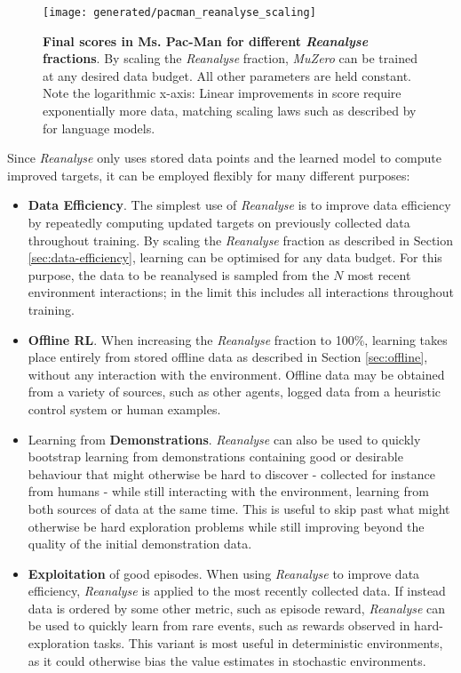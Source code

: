 \documentclass{article}
\newcommand{\muzero}{\emph{MuZero}}
\newcommand{\reanalyse}{\emph{Reanalyse}}
\begin{document}
\begin{figure}[t]
\texttt{[image: generated/pacman\_reanalyse\_scaling]}
\vspace*{-7mm}
\caption[]{
\label{fig:reanalyse-scaling}
\textbf{Final scores in Ms. Pac-Man for different \reanalyse{} fractions}. By scaling the \reanalyse{} fraction, \muzero{} can be trained at any desired data budget. All other parameters are held constant. Note the logarithmic x-axis: Linear improvements in score require exponentially more data, matching scaling laws such as described by \cite{kaplan2020scaling} for language models.
}
\end{figure}

Since \reanalyse{} only uses stored data points and the learned model to compute improved targets, it can be employed flexibly for many different purposes:

\begin{itemize}
\setlength\itemsep{0.1em}
\item \textbf{Data Efficiency}. The simplest use of \reanalyse{} is to improve data efficiency by repeatedly computing updated targets on previously collected data throughout training. By scaling the \reanalyse{} fraction as described in Section \ref{sec:data-efficiency}, learning can be optimised for any data budget. For this purpose, the data to be reanalysed is sampled from the $N$ most recent environment interactions; in the limit this includes all interactions throughout training.
\item \textbf{Offline RL}. When increasing the \reanalyse{} fraction to 100\%, learning takes place entirely from stored offline data as described in Section \ref{sec:offline}, without any interaction with the environment. Offline data may be obtained from a variety of sources, such as other agents, logged data from a heuristic control system or human examples.
\item Learning from \textbf{Demonstrations}. \reanalyse{} can also be used to quickly bootstrap learning from demonstrations containing good or desirable behaviour that might otherwise be hard to discover - collected for instance from humans - while still interacting with the environment, learning from both sources of data at the same time. This is useful to skip past what might otherwise be hard exploration problems while still improving beyond the quality of the initial demonstration data.
\item \textbf{Exploitation} of good episodes. When using \reanalyse{} to improve data efficiency, \reanalyse{} is applied to the most recently collected data. If instead data is ordered by some other metric, such as episode reward, \reanalyse{} can be used to quickly learn from rare events, such as rewards observed in hard-exploration tasks. This variant is most useful in deterministic environments, as it could otherwise bias the value estimates in stochastic environments.
\end{itemize}
\end{document}
